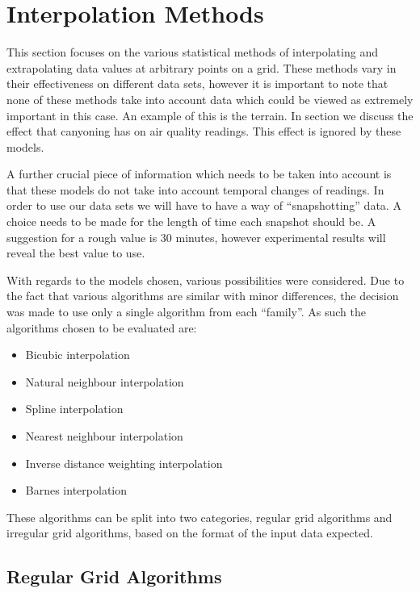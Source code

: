 \section{Interpolation Methods}\label{background_interpolation_methods}
    This section focuses on the various statistical methods of interpolating and extrapolating data values at arbitrary points on a grid. These methods vary in their effectiveness on different data sets, however it is important to note that none of these methods take into account data which could be viewed as extremely important in this case. An example of this is the terrain. In section  we discuss the effect that canyoning has on air quality readings. This effect is ignored by these models. 

    A further crucial piece of information which needs to be taken into account is that these models do not take into account temporal changes of readings. In order to use our data sets we will have to have a way of ``snapshotting'' data. A choice needs to be made for the length of time each snapshot should be. A suggestion for a rough value is 30 minutes, however experimental results will reveal the best value to use.

    With regards to the models chosen, various possibilities were considered. Due to the fact that various algorithms are similar with minor differences, the decision was made to use only a single algorithm from each ``family''. As such the algorithms chosen to be evaluated are:

    \begin{itemize}
        \item Bicubic interpolation
        \item Natural neighbour interpolation
        \item Spline interpolation
        \item Nearest neighbour interpolation
        \item Inverse distance weighting interpolation
        \item Barnes interpolation
    \end{itemize}

    These algorithms can be split into two categories, regular grid algorithms and irregular grid algorithms, based on the format of the input data expected. 

    \subsection{Regular Grid Algorithms}\label{background_interpolation_methods_regulargrid}

